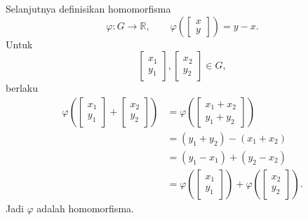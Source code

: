 \documentclass[10pt,a4paper]{article}
\begin{document}
\begin{enumerate}
        Selanjutnya definisikan homomorfisma
        \[
          \varphi:G\to\mathbb{R},
          \qquad
          \varphi\left(
          \begin{bmatrix}
            x\\y
          \end{bmatrix}
          \right)=y-x.
        \]
        Untuk
        \[
          \begin{bmatrix}
            x_1\\y_1
          \end{bmatrix},
          \begin{bmatrix}
            x_2\\y_2
          \end{bmatrix}
          \in G,
        \]
        berlaku
        \begin{align*}
          \varphi\left(
          \begin{bmatrix}
            x_1\\y_1
          \end{bmatrix}
          +
          \begin{bmatrix}
            x_2\\y_2
          \end{bmatrix}
          \right)
          &=
          \varphi\left(
          \begin{bmatrix}
            x_1+x_2\\y_1+y_2
          \end{bmatrix}
          \right) \\
          &=(y_1+y_2)-(x_1+x_2) \\
          &=(y_1-x_1)+(y_2-x_2) \\
          &=
          \varphi\left(
          \begin{bmatrix}
            x_1\\y_1
          \end{bmatrix}
          \right)
          +
          \varphi\left(
          \begin{bmatrix}
            x_2\\y_2
          \end{bmatrix}
          \right).
        \end{align*}
        Jadi $\varphi$ adalah homomorfisma.


\end{enumerate}
\end{document}
